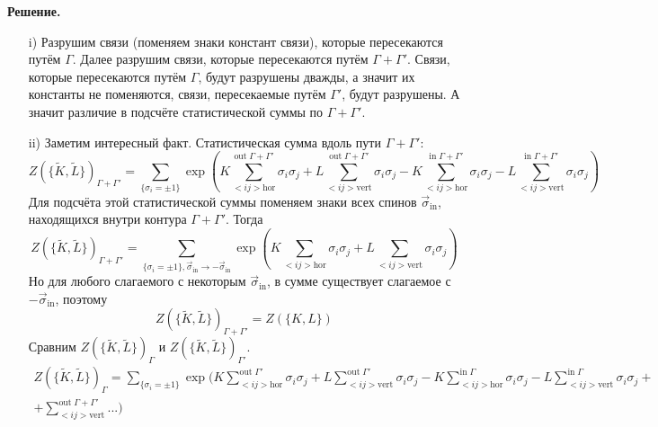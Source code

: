 \documentclass[12pt]{article}
\theoremstyle{definition}
\begin{document}
\begin{enumerate}
    \textbf{Решение.}
    \begin{itemize}
        \item[i)] Разрушим связи (поменяем знаки констант связи), которые пересекаются путём $\Gamma$. Далее разрушим связи, которые пересекаются путём $\Gamma+\Gamma'$. Связи, которые пересекаются путём $\Gamma$, будут разрушены дважды, а значит их константы не поменяются, связи, пересекаемые путём $\Gamma'$, будут разрушены. А значит различие в подсчёте статистической суммы по $\Gamma+\Gamma'$.
        \item[ii)] Заметим интересный факт. Статистическая сумма вдоль пути $\Gamma+\Gamma'$:
        \begin{equation*}
            Z(\{\tilde K,\tilde L\})_{\Gamma+\Gamma'}=\sum\limits_{\{\sigma_i=\pm1\}}\exp\left(K\sum\limits_{<ij>\text{hor}}^{\text{out}\;\Gamma+\Gamma'}\sigma_i\sigma_j+L\sum\limits_{<ij>\text{vert}}^{\text{out}\;\Gamma+\Gamma'}\sigma_i\sigma_j-K\sum\limits_{<ij>\text{hor}}^{\text{in}\;\Gamma+\Gamma'}\sigma_i\sigma_j-L\sum\limits_{<ij>\text{vert}}^{\text{in}\;\Gamma+\Gamma'}\sigma_i\sigma_j\right)
        \end{equation*}
        Для подсчёта этой статистической суммы поменяем знаки всех спинов $\vec{\sigma}_\text{in}$, находящихся внутри контура $\Gamma+\Gamma'$. Тогда
        \begin{equation*}
            Z(\{\tilde K,\tilde L\})_{\Gamma+\Gamma'}=\sum\limits_{\{\sigma_i=\pm1\},\vec{\sigma}_\text{in}\rightarrow-\vec{\sigma}_\text{in}}\exp\left(K\sum\limits_{<ij>\text{hor}}\sigma_i\sigma_j+L\sum\limits_{<ij>\text{vert}}\sigma_i\sigma_j\right)
        \end{equation*}
        Но для любого слагаемого с некоторым $\vec{\sigma}_\text{in}$, в сумме существует слагаемое с $-\vec{\sigma}_\text{in}$, поэтому
        \begin{equation}
            Z(\{\tilde K,\tilde L\})_{\Gamma+\Gamma'}=Z(\{K,L\})
        \end{equation}
        Сравним $Z(\{\tilde K,\tilde L\})_{\Gamma}$ и $Z(\{\tilde K,\tilde L\})_{\Gamma'}$.
        \begin{multline}
            Z(\{\tilde K,\tilde L\})_{\Gamma}=\sum\limits_{\{\sigma_i=\pm1\}}\exp(K\sum\limits_{<ij>\text{hor}}^{\text{out}\;\Gamma'}\sigma_i\sigma_j+L\sum\limits_{<ij>\text{vert}}^{\text{out}\;\Gamma'}\sigma_i\sigma_j-K\sum\limits_{<ij>\text{hor}}^{\text{in}\;\Gamma}\sigma_i\sigma_j-L\sum\limits_{<ij>\text{vert}}^{\text{in}\;\Gamma}\sigma_i\sigma_j+\\+\sum\limits_{<ij>\text{vert}}^{\text{out}\;\Gamma+\Gamma'}...)

\end{multline}
\end{itemize}
\end{enumerate}
\end{document}
